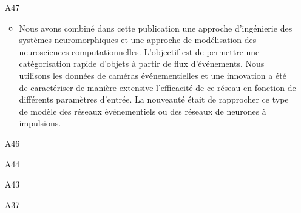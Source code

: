 \begin{enumerate}
\item[A47] %
%
\begin{itemize}
  \item Nous avons combiné dans cette publication une approche d'ingénierie des systèmes neuromorphiques et une approche de modélisation des neurosciences computationnelles. L'objectif est de permettre une catégorisation rapide d'objets à partir de flux d'événements. Nous utilisons les données de caméras événementielles et une innovation a été de caractériser de manière extensive l'efficacité de ce réseau en fonction de différents paramètres d'entrée. La nouveauté était de rapprocher ce type de modèle des réseaux événementiels ou des réseaux de neurones à impulsions.
\end{itemize}

\item[A46] %
%

\item[A44]  %

\item[A43] %

%
%
%
%

\item[A37]  %
%
%
%
%


\end{enumerate}
